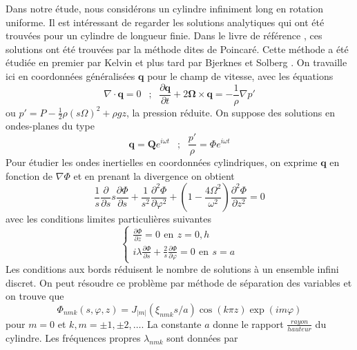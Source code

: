Dans notre étude, nous considérons un cylindre infiniment long en rotation uniforme. Il est intéressant de regarder les solutions analytiques qui ont été trouvées pour un cylindre de longueur finie. Dans le livre de référence \cite{greenspan1969theory}, ces solutions ont été trouvées par la méthode dites de Poincaré. Cette méthode a été étudiée en premier par Kelvin \cite{lord1880vibrations} et plus tard par Bjerknes et Solberg \cite{bjerknes1929zellulare}. On travaille ici en coordonnées généralisées $\bm{q}$ pour le champ de vitesse, avec les équations
\begin{equation}
    \nabla \cdot \bm{q} = 0 \,\ \,\ \text{;}\,\ \,\ \frac{\partial \bm{q}}{\partial t} + 2\mathbf{\Omega} \times \bm{q} = -\frac{1}{\rho}\nabla p'
\end{equation}
ou $p' = P - \frac{1}{2}\rho (s\Omega)^2 + \rho g z$, la pression réduite. On suppose des solutions en ondes-planes du type
\begin{equation}
    \bm{q} = \bm{Q}e^{i\omega t} \,\ \,\ \text{;} \,\ \,\ \frac{p'}{\rho} = \Phi e^{i\omega t}
\end{equation}
Pour étudier les ondes inertielles en coordonnées cylindriques, on exprime $\bm{q}$ en fonction de $\nabla \Phi$ et en prenant la divergence on obtient
\begin{equation}
    \frac{1}{s} \frac{\partial}{\partial s}s\frac{\partial\Phi}{\partial s} + \frac{1}{s^2} \frac{\partial^2 \Phi}{\partial \varphi^2} + \left( 1 - \frac{4\Omega^2}{\omega^2}\right)\frac{\partial^2 \Phi}{\partial z^2} = 0
\end{equation}
avec les conditions limites particulières suivantes
\begin{equation}
    \begin{cases}
    \frac{\partial \Phi}{\partial z} = 0 \,\ \text{en} \,\ z = 0,h \\
    i \lambda \frac{\partial \Phi}{\partial s} + \frac{2}{s} \frac{\partial \Phi}{\partial \varphi} = 0 \,\ \text{en} \,\ s = a
\end{cases}
\end{equation}
Les conditions aux bords réduisent le nombre de solutions à un ensemble infini discret. On peut résoudre ce problème par méthode de séparation des variables et on trouve que 
\begin{equation}
    \Phi_{nmk}(s,\varphi,z) = J_{\lvert m\rvert}(\xi_{nmk}s/a) \cos{(k\pi z)}\exp{(im\varphi)}
\end{equation}
pour $m = 0$ et $k,m = \pm 1, \pm 2,\dots$. La constante $a$ donne le rapport $\frac{rayon}{hauteur}$ du cylindre. Les fréquences propres $\lambda_{nmk}$ sont données par

